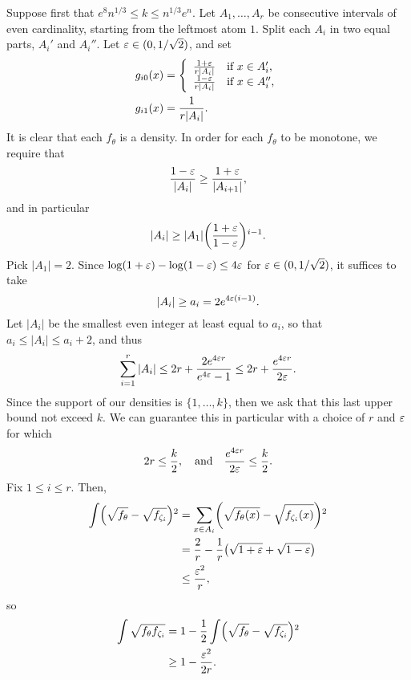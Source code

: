 Suppose first that $e^8 n^{1/3} \le k \le n^{1/3} e^n$. Let
$A_1, \dots, A_r$ be consecutive intervals of even cardinality,
starting from the leftmost atom $1$. Split each $A_i$ in two equal
parts, $A_i'$ and $A_i''$. Let $\varepsilon \in (0, 1/\sqrt{2})$, and set
\begin{align*}
  g_{i 0}(x) &= \left\{\begin{array}{ll}
                        \frac{1 + \eps}{r |A_i|} & \mbox{if $x \in A_i'$,} \\
                        \frac{1 - \eps}{r |A_i|} & \mbox{if $x \in A_i''$,}
                      \end{array} \right. \\
  g_{i 1}(x) &= \frac{1}{r |A_i|} .
\end{align*}
It is clear that each $f_\theta$ is a density. In order for each
$f_\theta$ to be monotone, we require that
\[
  \frac{1 - \varepsilon}{|A_i|} \ge \frac{1 + \varepsilon}{|A_{i + 1}|} ,
\]
and in particular
\[
  |A_i| \ge |A_1| \left(\frac{1 + \eps}{1 - \eps}\right)^{i - 1} .
\]
Pick $|A_1| = 2$. Since $\log (1 + \varepsilon) - \log (1 - \varepsilon) \le 4 \varepsilon$
for $\varepsilon \in (0, 1/\sqrt{2})$, it suffices to take
\[
  |A_i| \ge a_i = 2 e^{4 \varepsilon(i - 1)} .
\]
Let $|A_i|$ be the smallest even integer at least equal to $a_i$, so
that $a_i \le |A_i| \le a_i + 2$, and thus
\[
  \sum_{i = 1}^r |A_i| \le 2r + \frac{2 e^{4\varepsilon r}}{e^{4\varepsilon} - 1} \le 2r + \frac{e^{4 \varepsilon r}}{2 \varepsilon} .
\]
Since the support of our densities is $\{1, \dots, k\}$, then we ask
that this last upper bound not exceed $k$. We can guarantee this in
particular with a choice of $r$ and $\varepsilon$ for which
\begin{equation}
  2r \le \frac{k}{2}, \quad \text{and} \quad \frac{e^{4 \eps r}}{2\eps} \le \frac{k}{2} . \eqlabel{monotone-cond}
\end{equation}
Fix $1 \le i \le r$. Then,
\begin{align*}
  \int \left(\sqrt{f_\theta} - \sqrt{f_{\zeta_i}}\right)^2 &= \sum_{x \in A_i} \left(\sqrt{f_\theta(x)} - \sqrt{f_{\zeta_i}(x)}\right)^2 \\
                                                &= \frac{2}{r} - \frac{1}{r}\left(\sqrt{1 + \eps} + \sqrt{1 - \eps}\right) \\
                                                &\le \frac{\eps^2}{r} ,
\end{align*}
so
\begin{align*}
  \int \sqrt{f_\theta f_{\zeta_i}} &= 1 - \frac{1}{2} \int \left(\sqrt{f_\theta} - \sqrt{f_{\zeta_i}}\right)^2 \\
                                   &\ge 1 - \frac{\eps^2}{2r} .
\end{align*}
